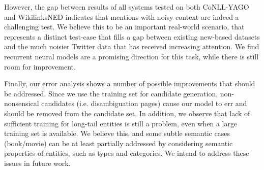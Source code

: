 \documentclass[11pt]{article}
\begin{document}
	However, the gap between results of all systems tested on both CoNLL-YAGO and WikilinksNED indicates that mentions with noisy context are indeed a challenging test. We believe this to be an important real-world scenario, that represents a distinct test-case that fills a gap between existing new-based datasets and the much noisier Twitter data \cite{ritter2011Named} that has received increasing attention. We find recurrent neural models are a promising direction for this task, while there is still room for improvement. 
	
	Finally, our error analysis shows a number of possible improvements that should be addressed. Since we use the training set for candidate generation, non-nonsensical candidates (i.e. disambiguation pages) cause our model to err and should be removed from the candidate set. In addition, we observe that lack of sufficient training for long-tail entities is still a problem, even when a large training set is available. We believe this, and some subtle semantic cases (book/movie) can be at least partially addressed by considering semantic properties of entities, such as types and categories. We intend to address these issues in future work.
	
	
	
	
\end{document}
